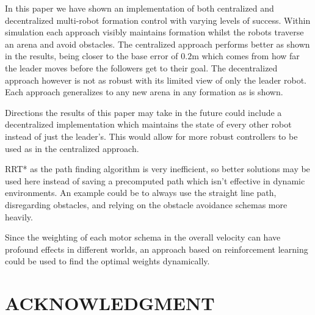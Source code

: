\documentclass[letterpaper, 10 pt, conference]{ieeeconf}  %
\begin{document}
In this paper we have shown an implementation of both centralized and decentralized multi-robot formation control with varying levels of success. Within simulation each approach visibly maintains formation whilst the robots traverse an arena and avoid obstacles. The centralized approach performs better as shown in the results, being closer to the base error of $0.2$m which comes from how far the leader moves before the followers get to their goal. The decentralized approach however is not as robust with its limited view of only the leader robot. Each approach generalizes to any new arena in any formation as is shown.

Directions the results of this paper may take in the future could include a decentralized implementation which maintains the state of every other robot instead of just the leader's. This would allow for more robust controllers to be used as in the centralized approach.

RRT* as the path finding algorithm is very inefficient, so better solutions may be used here instead of saving a precomputed path which isn't effective in dynamic environments. An example could be to always use the straight line path, disregarding obstacles, and relying on the obstacle avoidance schemas more heavily.

Since the weighting of each motor schema in the overall velocity can have profound effects in different worlds, an approach based on reinforcement learning could be used to find the optimal weights dynamically.

\addtolength{\textheight}{-12cm}   %

\section{ACKNOWLEDGMENT}
\end{document}

